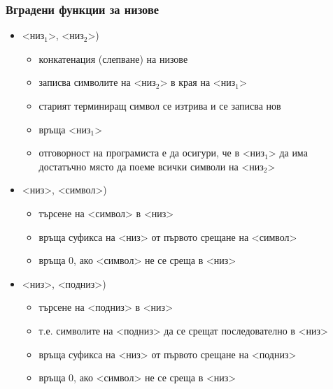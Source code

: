 \documentclass[alsotrans]{beamerswitch}
\newcommand{\s}{<низ>\xspace}
\renewcommand{\ss}[1]{<низ$_{#1}$>\xspace}
\begin{document}
\begin{frame}
  \frametitle{Вградени функции за низове}

  \begin{itemize}[<+->]
  \item {}\ss1, \ss2\tta)
    \begin{itemize}
    \item \alert{конкатенация} (слепване) на низове
    \item записва символите на \ss2 в края на \ss1
    \item старият терминиращ символ се изтрива и се записва нов
    \item връща \ss1
    \item \alert{отговорност на програмиста е да осигури, че в \ss1 да има достатъчно място да поеме всички символи на \ss2}
    \end{itemize}
  \item {}\s, <символ>\tta)
    \begin{itemize}
    \item търсене на <символ> в \s
    \item връща \alert{суфикса} на \s от първото срещане на <символ>
    \item връща 0, ако <символ> не се среща в \s
    \end{itemize}
  \item {}\s, <подниз>\tta)
    \begin{itemize}
    \item търсене на <подниз> в \s
    \item т.е. символите на <подниз> да се срещат последователно в \s
    \item връща \alert{суфикса} на \s от първото срещане на <подниз>
    \item връща 0, ако <символ> не се среща в \s
    \end{itemize}
  \end{itemize}
\end{frame}
\end{document}
